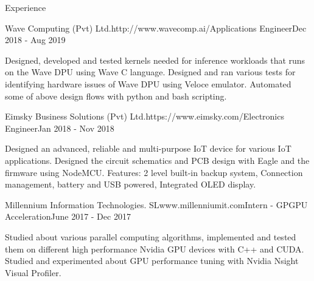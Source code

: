 \documentclass[
	11pt, %
]{./assets/resume} %
\begin{document}
\begin{rSection}{Experience}
	\pagebreak
    
	\begin{rSubsectionX}{Wave Computing (Pvt) Ltd.}{http://www.wavecomp.ai/}{Applications Engineer}{Dec 2018 - Aug 2019}
        \item Designed, developed and tested kernels needed for inference workloads that runs on the Wave DPU using Wave C language. Designed and ran various tests for identifying hardware issues of Wave DPU using Veloce emulator. Automated some of above design flows with python and bash scripting.
	\end{rSubsectionX}

	\begin{rSubsectionX}{Eimsky Business Solutions (Pvt) Ltd.}{https://www.eimsky.com/}{Electronics Engineer}{Jan 2018 - Nov 2018}
        \item Designed an advanced, reliable and multi-purpose IoT device for various IoT applications. Designed the circuit schematics and PCB design with Eagle and the firmware using NodeMCU. Features: 2 level built-in backup system, Connection management, battery and USB powered, Integrated OLED display.
	\end{rSubsectionX}

 	\begin{rSubsectionX}{Millennium Information Technologies. SL}{www.millenniumit.com}{Intern - GPGPU Acceleration}{June 2017 - Dec 2017}
        \item Studied about various parallel computing algorithms, implemented and tested them on different high performance Nvidia GPU devices with C++ and CUDA. Studied and experimented about GPU performance tuning with Nvidia Nsight Visual Profiler.
	\end{rSubsectionX}
\end{rSection}

\end{document}
